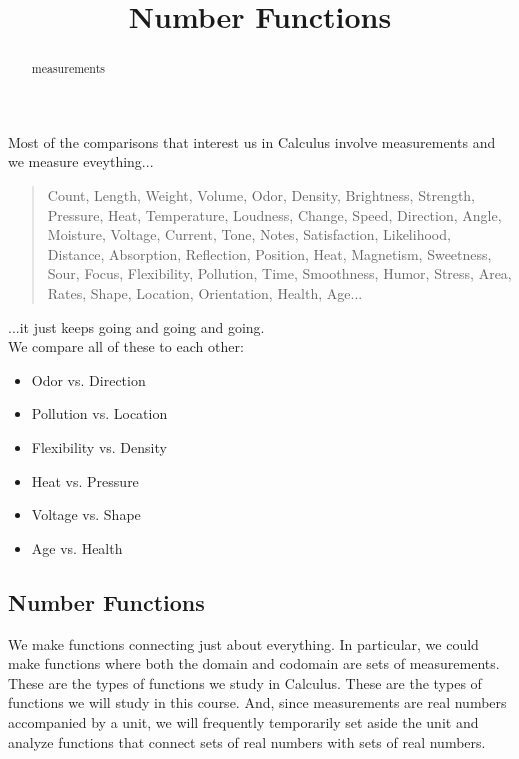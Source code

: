 \documentclass{ximera}
\title{Number Functions}
\begin{document}
\begin{abstract}
measurements
\end{abstract}
\maketitle





Most of the comparisons that interest us in Calculus involve measurements and we measure eveything...\\

\begin{quote}
Count, Length, Weight, Volume, Odor, Density, Brightness, Strength, Pressure, Heat, Temperature, Loudness, Change, Speed, Direction, Angle, Moisture, Voltage, Current, Tone, Notes, Satisfaction, Likelihood, Distance, Absorption, Reflection, Position, Heat, Magnetism, Sweetness, Sour, Focus, Flexibility, Pollution, Time, Smoothness, Humor, Stress, Area, Rates, Shape, Location, Orientation, Health, Age... \\
\end{quote}


...it just keeps going and going and going. \\


We compare all of these to each other:



\begin{itemize}
\item Odor vs. Direction
\item Pollution vs. Location
\item Flexibility vs. Density
\item Heat vs. Pressure
\item Voltage vs. Shape 
\item Age vs. Health
\end{itemize}







\subsection*{Number Functions}

We make functions connecting just about everything.  In particular, we could make functions where both the domain and codomain are sets of measurements. These are the types of functions we study in Calculus.  These are the types of functions we will study in this course.  And, since measurements are real numbers accompanied by a unit, we will frequently temporarily set aside the unit and analyze functions that connect sets of real numbers with sets of real numbers. \\
\end{document}
